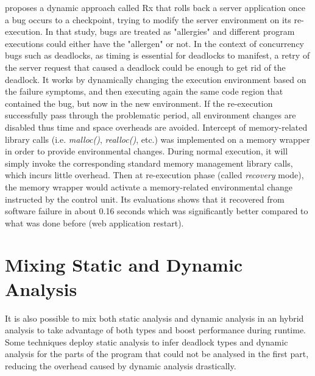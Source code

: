 \citet{rx} proposes a dynamic approach called Rx that rolls back a server application once a bug occurs to a checkpoint,
trying to modify the server environment on its re-execution. In that study, bugs are treated as "allergies" and different program executions
could either have the "allergen" or not. In the context of concurrency bugs such as deadlocks, as timing is essential for deadlocks to manifest,
a retry of the server request that caused a deadlock could be enough to get rid of the deadlock.
It works by dynamically changing the execution environment based on the failure symptoms, and then
executing again the same code region that contained the bug, but now in the new environment.
If the re-execution successfully pass through the problematic period,
all environment changes are disabled thus time and space overheads are avoided.
Intercept of memory-related library calls (i.e. \emph{malloc()}, \emph{realloc()}, etc.) was implemented on a memory wrapper
in order to provide environmental changes. During normal execution, it will simply invoke the corresponding
standard memory management library calls, which incurs little overhead. Then at re-execution phase (called \emph{recovery} mode), the memory wrapper would activate
a memory-related environmental change instructed by the control unit. Its evaluations shows that it recovered from software failure in about 0.16 seconds which was
significantly better compared to what was done before (web application restart).

\section{Mixing Static and Dynamic Analysis}

It is also possible to mix both static analysis and dynamic analysis in an hybrid analysis to take advantage of both types and boost performance during runtime.
Some techniques deploy static analysis to infer deadlock types and dynamic analysis for the parts of the program that could not be analysed in the first part,
reducing the overhead caused by dynamic analysis drastically.

